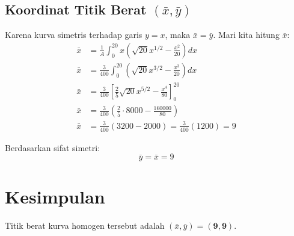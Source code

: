 \documentclass[12pt,a4paper]{article}
\begin{document}
\subsection{Koordinat Titik Berat $(\bar{x}, \bar{y})$}
Karena kurva simetris terhadap garis $y = x$, maka $\bar{x} = \bar{y}$. Mari kita hitung $\bar{x}$:
\begin{align*}
  \bar{x} &= \frac{1}{A} \int_{0}^{20} x \left( \sqrt{20}x^{1/2} - \frac{x^2}{20} \right) dx \\
  \bar{x} &= \frac{3}{400} \int_{0}^{20} \left( \sqrt{20}x^{3/2} - \frac{x^3}{20} \right) dx \\
  \bar{x} &= \frac{3}{400} \left[ \frac{2}{5} \sqrt{20} x^{5/2} - \frac{x^4}{80} \right]_0^{20} \\
  \bar{x} &= \frac{3}{400} \left( \frac{2}{5} \cdot 8000 - \frac{160000}{80} \right) \\
  \bar{x} &= \frac{3}{400} (3200 - 2000) = \frac{3}{400} (1200) = 9
\end{align*}

Berdasarkan sifat simetri:
\begin{equation*}
  \bar{y} = \bar{x} = 9
\end{equation*}

\section{Kesimpulan}
Titik berat kurva homogen tersebut adalah $(\bar{x}, \bar{y}) = \mathbf{(9, 9)}$.
\end{document}
